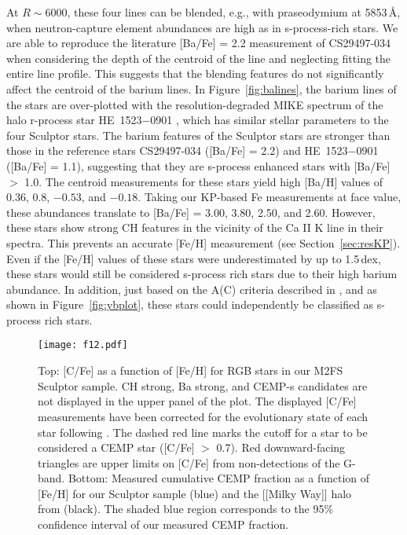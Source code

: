 \documentclass{emulateapj-rtx4}
\begin{document}
At $R\sim6000$, these four lines can be blended, e.g., with praseodymium at 5853\,\AA, when neutron-capture element abundances are high as in s-process-rich stars. 
We are able to reproduce the literature [Ba/Fe] = 2.2 measurement of CS29497-034 when considering the depth of the centroid of the line and neglecting fitting the entire line profile. 
This suggests that the blending features do not significantly affect the centroid of the barium lines. 
In Figure~\ref{fig:balines}, the barium lines of the stars are over-plotted with the resolution-degraded MIKE spectrum of the halo r-process star HE~1523$-$0901 \citep{fcn+07}, which has similar stellar parameters to the four Sculptor stars. 
The barium features of the Sculptor stars are stronger than those in the reference stars CS29497-034 ([Ba/Fe] = 2.2) and HE~1523$-$0901 ([Ba/Fe] = 1.1), suggesting that they are s-process enhanced stars with [Ba/Fe] $>$ 1.0. 
The centroid measurements for these stars yield high [Ba/H] values of 0.36, 0.8, $-0.53$, and $-0.18$. Taking our KP-based Fe measurements at face value, these abundances translate to [Ba/Fe] = 3.00, 3.80, 2.50, and 2.60. However, these stars show strong CH features in the vicinity of the Ca II K line in their spectra. This prevents an accurate [Fe/H] measurement (see Section~\ref{sec:resKP}). Even if the [Fe/H] values of these stars were underestimated by up to 1.5\,dex, these stars would still be considered s-process rich stars due to their high barium abundance. In addition, just based on the A(C) criteria described in \citet{ybp+16}, and as shown in Figure~\ref{fig:ybplot},
these stars could independently be classified as s-process rich stars.


\begin{figure*}[!t]
\centering
\texttt{[image: f12.pdf]}
\caption{Top: [C/Fe] as a function of [Fe/H] for RGB stars in our M2FS Sculptor sample. CH strong, Ba strong, and CEMP-s candidates are not displayed in the upper panel of the plot. The displayed [C/Fe] measurements
have been corrected for the evolutionary state of each star following \citet{pfb+14}. The dashed 
red line marks the cutoff for a star to be considered a CEMP star ([C/Fe] $>$ 0.7). Red downward-facing triangles are upper limits on [C/Fe]
from non-detections of the G-band.
Bottom: Measured cumulative CEMP fraction as a function of [Fe/H] for our Sculptor sample (blue) and the [[Milky Way]]
halo from \citet{pfb+14} (black). The shaded blue region corresponds to the 95\% confidence interval of our measured CEMP
fraction.}
\vspace{0.50cm}
\label{fig:CEMPfracs}
\end{figure*}
\end{document}
